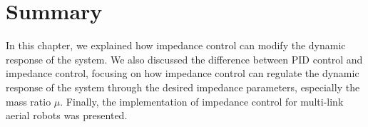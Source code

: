 




\section{Summary}

In this chapter, we explained how impedance control can modify the dynamic response of the system. We also discussed the difference between PID control and impedance control, focusing on how impedance control can regulate the dynamic response of the system through the desired impedance parameters, especially the mass ratio $\mu$. Finally, the implementation of impedance control for multi-link aerial robots was presented.